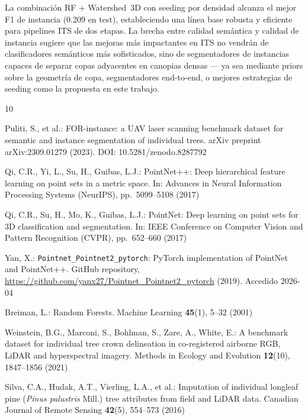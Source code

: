 \documentclass[runningheads]{llncs}
\begin{document}
La combinaci\'on RF + Watershed~3D con seeding por densidad alcanza el mejor F1 de instancia (0.209 en test), estableciendo una l\'inea base robusta y eficiente para pipelines ITS de dos etapas. La brecha entre calidad sem\'antica y calidad de instancia sugiere que las mejoras m\'as impactantes en ITS no vendr\'an de clasificadores sem\'anticos m\'as sofisticados, sino de segmentadores de instancias capaces de separar copas adyacentes en canopias densas --- ya sea mediante priors sobre la geometr\'ia de copa, segmentadores end-to-end, o mejores estrategias de seeding como la propuesta en este trabajo.

\begin{thebibliography}{10}

Puliti, S., et al.:
FOR-instance: a UAV laser scanning benchmark dataset for semantic and instance segmentation of individual trees.
arXiv preprint arXiv:2309.01279 (2023).
DOI: 10.5281/zenodo.8287792

Qi, C.R., Yi, L., Su, H., Guibas, L.J.:
PointNet++: Deep hierarchical feature learning on point sets in a metric space.
In: Advances in Neural Information Processing Systems (NeurIPS), pp.~5099--5108 (2017)

Qi, C.R., Su, H., Mo, K., Guibas, L.J.:
PointNet: Deep learning on point sets for 3D classification and segmentation.
In: IEEE Conference on Computer Vision and Pattern Recognition (CVPR), pp.~652--660 (2017)

Yan, X.:
\texttt{Pointnet\_Pointnet2\_pytorch}: PyTorch implementation of PointNet and PointNet++.
GitHub repository, \url{https://github.com/yanx27/Pointnet_Pointnet2_pytorch} (2019). Accedido 2026-04

Breiman, L.:
Random Forests.
Machine Learning \textbf{45}(1), 5--32 (2001)

Weinstein, B.G., Marconi, S., Bohlman, S., Zare, A., White, E.:
A benchmark dataset for individual tree crown delineation in co-registered airborne RGB, LiDAR and hyperspectral imagery.
Methods in Ecology and Evolution \textbf{12}(10), 1847--1856 (2021)

Silva, C.A., Hudak, A.T., Vierling, L.A., et al.:
Imputation of individual longleaf pine (\emph{Pinus palustris} Mill.) tree attributes from field and LiDAR data.
Canadian Journal of Remote Sensing \textbf{42}(5), 554--573 (2016)


\end{thebibliography}
\end{document}
